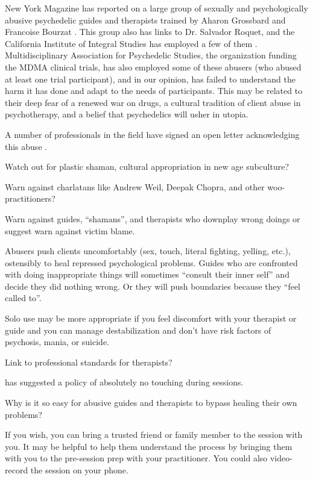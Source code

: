 \documentclass[12pt,letterpaper]{article}
\begin{document}
New York Magazine has reported on a large group of sexually and psychologically abusive psychedelic guides and therapists trained by Aharon Grossbard and Francoise Bourzat \cite{powerTrip}. This group also has links to Dr. Salvador Roquet, and the California Institute of Integral Studies has employed a few of them . Multidisciplinary Association for Psychedelic Studies, the organization funding the MDMA clinical trials, has also employed some of these abusers (who abused at least one trial participant), and in our opinion, has failed to understand the harm it has done and adapt to the needs of participants. This may be related to their deep fear of a renewed war on drugs, a cultural tradition of client abuse in psychotherapy, and a belief that psychedelics will usher in utopia.

A number of professionals in the field have signed an open letter acknowledging this abuse \cite{abuseLetter}. 

Watch out for plastic shaman, cultural appropriation in new age subculture?

Warn against charlatans like Andrew Weil, Deepak Chopra, and other woo-practitioners?

Warn against guides, “shamans”, and therapists who downplay wrong doings or suggest warn against victim blame.

Abusers push clients uncomfortably (sex, touch, literal fighting, yelling, etc.), ostensibly to heal repressed psychological problems. Guides who are confronted with doing inappropriate things will sometimes “consult their inner self” and decide they did nothing wrong. Or they will push boundaries because they “feel called to”.

Solo use may be more appropriate if you feel discomfort with your therapist or guide and you can manage destabilization and don't have risk factors of psychosis, mania, or suicide.

Link to professional standards for therapists?

\textcite{noTouch} has suggested a policy of absolutely no touching during sessions.

Why is it so easy for abusive guides and therapists to bypass healing their own problems?

If you wish, you can bring a trusted friend or family member to the session with you. It may be helpful to help them understand the process by bringing them with you to the pre-session prep with your practitioner. You could also video-record the session on your phone.
\end{document}
